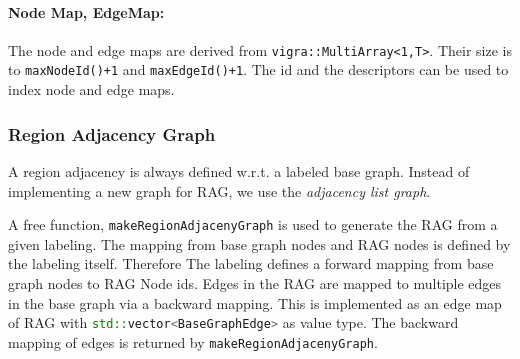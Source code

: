 \paragraph{Node Map, EdgeMap:} 
The node and edge maps are derived from \lstinline{vigra::MultiArray<1,T>}.
Their size is to \lstinline{maxNodeId()+1} and  \lstinline{maxEdgeId()+1}.
The id and the descriptors can be used to index node and edge maps.


%
%
%
%


\subsubsection{Region Adjacency Graph} \label{sec:graphs_rag}

A region adjacency is always defined w.r.t. a labeled base graph.
Instead of implementing a new graph for RAG, we use
the \emph{adjacency list graph}.

A free function, \lstinline[language=c++]{makeRegionAdjacenyGraph} is used to generate the RAG from a given labeling.
The mapping from base graph nodes and RAG nodes  is defined
by the labeling itself. Therefore
The labeling defines a forward mapping from base graph nodes
to RAG Node ids.
Edges in the RAG are mapped to multiple edges in the base graph
via a backward mapping.
This is implemented as an edge map of RAG with
\lstinline[language=c++]{std::vector<BaseGraphEdge>} as value type.
The backward mapping of edges is returned by \lstinline[language=c++]{makeRegionAdjacenyGraph}.


